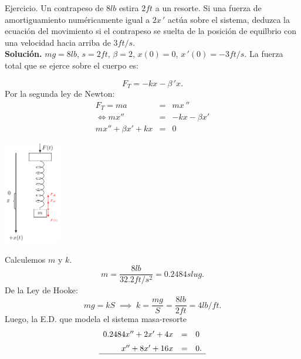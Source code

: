 \documentclass{beamer}
\begin{document}
\begin{frame}[t]
	\begin{alertblock}{Ejercicio.}
		Un contrapeso de \(8lb\) estira \(2ft\) a un resorte.
		Si una fuerza de amortiguamiento numéricamente igual a \(2x\,'\) actúa sobre el sistema, deduzca la ecuación del movimiento si el contrapeso se suelta de la posición de equilbrio con una velocidad hacia arriba de \(3ft/s\). \\[2mm]
		\textbf{Solución.} \(mg=8lb\), \(s=2ft\), \(\beta = 2\), \(x(0) = 0\), \(x\,'(0) =-3ft/s\). La fuerza total que se ejerce sobre el cuerpo es:
		\begin{minipage}{0.7\linewidth}
		\[
			F_T = -kx- \beta \,'x.
		\]
			Por la segunda ley de Newton:
			\[
				\begin{array}{rcl}
					F_T = ma & = & mx\,'' \\[2mm]
					\iff mx'' & = & -kx - \beta x' \\[2mm]
					mx'' + \beta x' + kx & = & 0
				\end{array}
			\]
		\end{minipage}
		\begin{minipage}{0.2\linewidth}
			\includegraphics[height = 4.5cm]{IMAGENES/6/tikz.pdf}
		\end{minipage}
	\end{alertblock}
\end{frame}

\begin{frame}[t]
	\begin{alertblock}{}
		Calculemos \(m\) y \(k\). \\[2mm]
		\[
			m = \dfrac{8lb}{32.2ft/s^2} = 0.2484 slug.
		\]
		De la Ley de Hooke:
		\[
			mg  = kS \;\implies\; k = \dfrac{mg}{S} = \dfrac{8lb}{2ft} = 4lb/ft.
		\]
		Luego, la E.D. que modela el sistema masa-resorte
		\[
			\begin{array}{rcl}
				0.2484x'' + 2x' +4x & = & 0 \\[2mm]
				x'' + 8x' +16x & = & 0. \\ \hline
			\end{array}
		\]
	\end{alertblock}
\end{frame}
\end{document}
